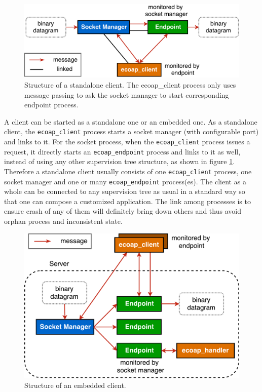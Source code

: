 \begin{figure}[!htbp]
\centering
\includegraphics[scale = 0.55]{ecoap_client_standalone}
\caption{Structure of a standalone client. The ecoap\_client process only uses message passing to ask the socket manager to start corresponding endpoint process.}
\label{fig:ecoap_client_standalone}
\end{figure}

A client can be started as a standalone one or an embedded one. As a standalone client, the \verb|ecoap_client| process starts a socket manager (with configurable port) and links to it. For the socket process, when the \verb|ecoap_client| process issues a request, it directly starts an \verb|ecoap_endpoint| process and links to it as well, instead of using any other supervision tree structure, as shown in figure \ref{fig:ecoap_client_standalone}. Therefore a standalone client usually consists of one \verb|ecoap_client| process, one socket manager and one or many \verb|ecoap_endpoint| process(es). The client as a whole can be connected to any supervision tree as usual in a standard way so that one can compose a customized application. The link among processes is to ensure crash of any of them will definitely bring down others and thus avoid orphan process and inconsistent state. 

\begin{figure}[!htbp]
\centering
\includegraphics[scale = 0.55]{ecoap_client_embedded}
\caption{Structure of an embedded client.}
\label{fig:ecoap_client_embedded}
\end{figure}

